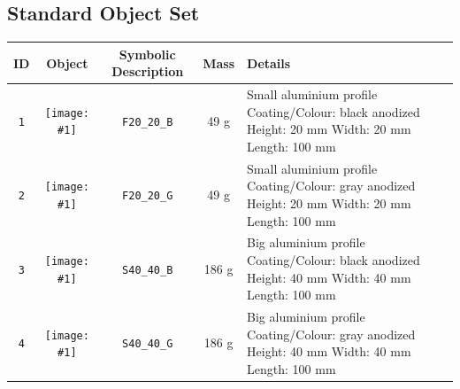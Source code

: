 



\subsection{Standard Object Set}


\newcommand{\imageView}[1]{\texttt{[image: \#1]}}
{
\newcommand{\rowpadding}{0.4cm}
\setlength\extrarowheight{\rowpadding}
\begin{table}[p]

\begin{tabular}{|c|c|c|c|m{8cm}|}
\hline
ID & Object & Symbolic Description & Mass & Details \\
\hline

\texttt{1} & \imageView{./images/F20_20_B.jpg} & \texttt{F20\_20\_B} & 49 g & Small aluminium profile \newline
 Coating/Colour: black anodized\newline
 Height: 20 mm \newline
 Width: 20 mm \newline
 Length: 100 mm \\ [\rowpadding]
\hline

\texttt{2} & \imageView{./images/F20_20_G.jpg} & \texttt{F20\_20\_G} & 49 g & Small aluminium profile \newline
 Coating/Colour: gray anodized\newline
 Height: 20 mm \newline
 Width: 20 mm \newline
 Length: 100 mm \\ [\rowpadding]
\hline

\texttt{3} & \imageView{./images/S40_40_B.jpg} & \texttt{S40\_40\_B} & 186 g & Big aluminium profile\newline
 Coating/Colour: black anodized\newline
 Height: 40 mm \newline
 Width: 40 mm \newline
 Length: 100 mm \\ [\rowpadding]
\hline

\texttt{4} & \imageView{./images/S40_40_G.jpg} & \texttt{S40\_40\_G} & 186 g & Big aluminium profile \newline
 Coating/Colour:  gray anodized\newline
 Height: 40 mm \newline
 Width: 40 mm \newline
 Length: 100 mm \\ [\rowpadding]
\hline


\end{tabular}
\end{table}}
